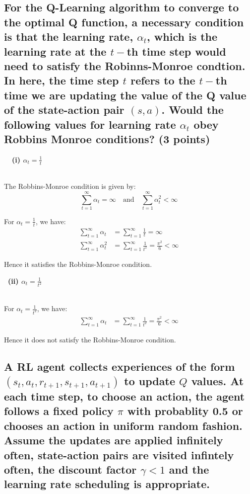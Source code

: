 \documentclass{article}
\begin{document}
\subsection{For the Q-Learning algorithm to converge to the optimal Q function, a necessary condition is that the learning rate, $\alpha_t$, which is the learning rate at the $t-$th time step would need to satisfy the Robinns-Monroe condtion. In here, the time step $t$ refers to the $t-$th time we are updating the value of the Q value of the state-action pair $(s, a)$. Would the following values for learning rate $\alpha_t$ obey Robbins Monroe conditions? (3 points)}

\textbf{\quad\ \ (i) $\alpha_t = \frac{1}{t}$}

\,\\
The Robbins-Monroe condition is given by:
\begin{equation*}
	\sum_{t=1}^{\infty} \alpha_t = \infty \quad \text{and} \quad \sum_{t=1}^{\infty} \alpha_t^2 < \infty
\end{equation*}

\noindent
For $\alpha_t = \frac{1}{t}$, we have:
\begin{align*}
	\sum_{t=1}^{\infty} \alpha_t &= \sum_{t=1}^{\infty} \frac{1}{t} = \infty \\
	\sum_{t=1}^{\infty} \alpha_t^2 &= \sum_{t=1}^{\infty} \frac{1}{t^2} = \frac{\pi^2}{6} < \infty
\end{align*}

\noindent
Hence it satisfies the Robbins-Monroe condition.

\noindent
\textbf{\quad\ (ii) $\alpha_t = \frac{1}{t^2}$}

\,\\
For $\alpha_t = \frac{1}{t^2}$, we have:
\begin{align*}
	\sum_{t=1}^{\infty} \alpha_t &= \sum_{t=1}^{\infty} \frac{1}{t^2} = \frac{\pi^2}{6} < \infty
\end{align*}

\noindent
Hence it does not satisfy the Robbins-Monroe condition.


\subsection{A RL agent collects experiences of the form $(s_t, a_t, r_{t+1}, s_{t+1}, a_{t+1})$ to update $Q$ values. At each time step, to choose an action, the agent follows a fixed policy $\pi$ with probablity 0.5 or chooses an action in uniform random fashion. Assume the updates are applied infinitely often, state-action pairs are visited infintely often, the discount factor $\gamma < 1$ and the learning rate scheduling is appropriate.}
\end{document}
